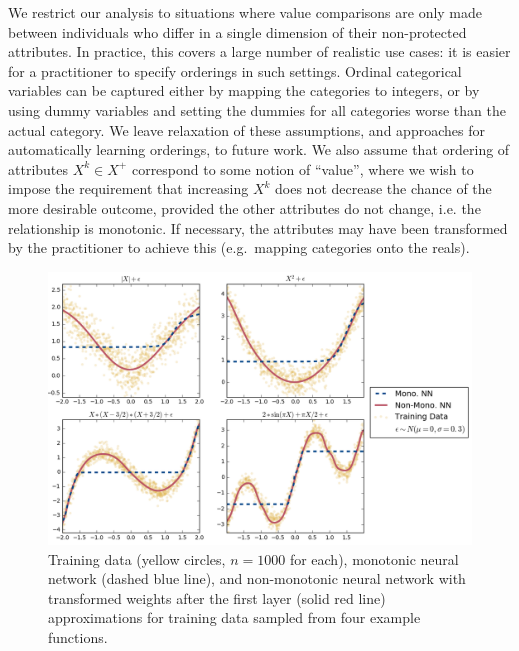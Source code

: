     We restrict our analysis to situations where value comparisons are only made between individuals who differ in a single dimension of their non-protected attributes. In practice, this covers a large number of realistic use cases: it is easier for a practitioner to specify orderings in such settings. Ordinal categorical variables can be captured either by mapping the categories to integers, or by using dummy variables and setting the dummies for all categories worse than the actual category. We leave relaxation of these assumptions, and approaches for automatically learning orderings, to future work.  We also assume that ordering of attributes $X^k\in X^+$ correspond to some notion of ``value'', where we wish to impose the requirement that increasing $X^k$ does not decrease the chance of the more desirable outcome, provided the other attributes do not change, i.e. the relationship is monotonic. If necessary, the attributes may have been transformed by the practitioner to achieve this (e.g.\ mapping categories onto the reals).
    
    \begin{figure}[t!]
        \centering
        \includegraphics[width=\textwidth]{fig_monofair/mixed_monotonicty_four_functions.png}
        \caption{Training data (yellow circles, $n=1000$ for each), monotonic neural network (dashed blue line), and non-monotonic neural network with transformed weights after the first layer (solid red line) approximations for training data sampled from four example functions.}
        \label{fig:fourfunctions}
    \end{figure}
    
